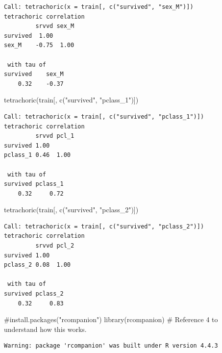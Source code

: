 \documentclass[
  letterpaper,
  DIV=11,
  numbers=noendperiod]{scrartcl}
\newenvironment{Shaded}{\begin{snugshade}}{\end{snugshade}}
\newcommand{\CommentTok}[1]{\textcolor[rgb]{0.37,0.37,0.37}{#1}}
\newcommand{\FunctionTok}[1]{\textcolor[rgb]{0.28,0.35,0.67}{#1}}
\newcommand{\NormalTok}[1]{\textcolor[rgb]{0.00,0.23,0.31}{#1}}
\newcommand{\StringTok}[1]{\textcolor[rgb]{0.13,0.47,0.30}{#1}}
\begin{document}
\begin{verbatim}
Call: tetrachoric(x = train[, c("survived", "sex_M")])
tetrachoric correlation 
         srvvd sex_M
survived  1.00      
sex_M    -0.75  1.00

 with tau of 
survived    sex_M 
    0.32    -0.37 
\end{verbatim}

\begin{Shaded}
\begin{Highlighting}[]
\FunctionTok{tetrachoric}\NormalTok{(train[, }\FunctionTok{c}\NormalTok{(}\StringTok{"survived"}\NormalTok{, }\StringTok{"pclass\_1"}\NormalTok{)])}
\end{Highlighting}
\end{Shaded}

\begin{verbatim}
Call: tetrachoric(x = train[, c("survived", "pclass_1")])
tetrachoric correlation 
         srvvd pcl_1
survived 1.00       
pclass_1 0.46  1.00 

 with tau of 
survived pclass_1 
    0.32     0.72 
\end{verbatim}

\begin{Shaded}
\begin{Highlighting}[]
\FunctionTok{tetrachoric}\NormalTok{(train[, }\FunctionTok{c}\NormalTok{(}\StringTok{"survived"}\NormalTok{, }\StringTok{"pclass\_2"}\NormalTok{)])}
\end{Highlighting}
\end{Shaded}

\begin{verbatim}
Call: tetrachoric(x = train[, c("survived", "pclass_2")])
tetrachoric correlation 
         srvvd pcl_2
survived 1.00       
pclass_2 0.08  1.00 

 with tau of 
survived pclass_2 
    0.32     0.83 
\end{verbatim}

\begin{Shaded}
\begin{Highlighting}[]
\CommentTok{\#install.packages("rcompanion")}
\FunctionTok{library}\NormalTok{(rcompanion) }\CommentTok{\# Reference 4 to understand how this works.}
\end{Highlighting}
\end{Shaded}

\begin{verbatim}
Warning: package 'rcompanion' was built under R version 4.4.3
\end{verbatim}
\end{document}
